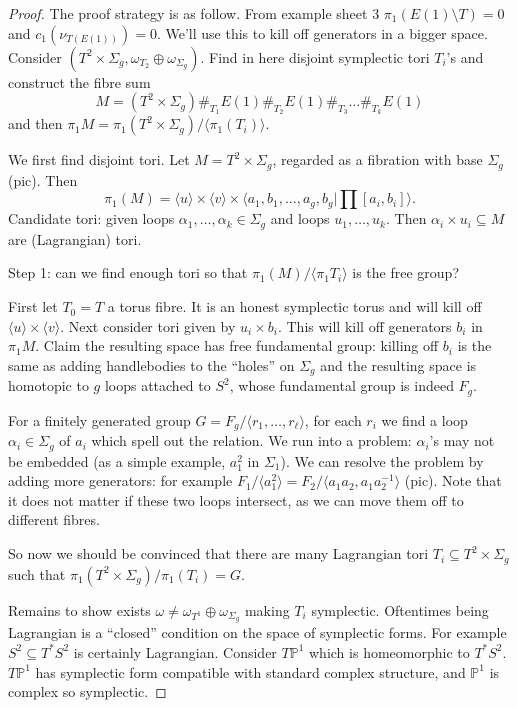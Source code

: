 \documentclass[a4paper]{article}
\renewcommand*{\P}{\mathbb{P}}
\begin{document}
\begin{proof}
  The proof strategy is as follow. From example sheet 3 \(\pi_1(E(1) \setminus T) = 0\) and \(c_1(\nu_{T(E(1))}) = 0\). We'll use this to kill off generators in a bigger space. Consider \((T^2 \times \Sigma_g, \omega_{T_2} \oplus \omega_{\Sigma_g})\). Find in here disjoint symplectic tori \(T_i\)'s and construct the fibre sum
  \[
    M = (T^2 \times \Sigma_g) \#_{T_1} E(1) \#_{T_2} E(1) \#_{T_3} \dots \#_{T_k} E(1)
  \]
  and then \(\pi_1M = \pi_1(T^2 \times \Sigma_g)/\langle \pi_1(T_i)\rangle\).

  We first find disjoint tori. Let \(M = T^2 \times \Sigma_g\), regarded as a fibration with base \(\Sigma_g\) (pic). Then
  \[
    \pi_1(M) = \langle u \rangle \times \langle v \rangle \times \langle a_1, b_1, \dots, a_g, b_g | \prod [a_i, b_i] \rangle.
  \]
  Candidate tori: given loops \(\alpha_1, \dots, \alpha_k \in \Sigma_g\) and loops \(u_1, \dots, u_k\). Then \(\alpha_i \times u_i \subseteq M\) are (Lagrangian) tori.

  Step 1: can we find enough tori so that \(\pi_1(M)/\langle \pi_1 T_i\rangle\) is the free group?

  First let \(T_0 = T\) a torus fibre. It is an honest symplectic torus and will kill off \(\langle u \rangle \times \langle v \rangle\). Next consider tori given by \(u_i \times b_i\). This will kill off generators \(b_i\) in \(\pi_1M\). Claim the resulting space has free fundamental group: killing off \(b_i\) is the same as adding handlebodies to the ``holes'' on \(\Sigma_g\) and the resulting space is homotopic to \(g\) loops attached to \(S^2\), whose fundamental group is indeed \(F_g\).

  For a finitely generated group \(G = F_g/ \langle r_1, \dots, r_\ell \rangle\), for each \(r_i\) we find a loop \(\alpha_i \in \Sigma_g\) of \(a_i\) which spell out the relation. We run into a problem: \(\alpha_i\)'s may not be embedded (as a simple example, \(a_1^2\) in \(\Sigma_1\)). We can resolve the problem by adding more generators: for example \(F_1/\langle a_1^2 \rangle = F_2/\langle a_1a_2, a_1a_2^{-1} \rangle\) (pic). Note that it does not matter if these two loops intersect, as we can move them off to different fibres.

  So now we should be convinced that there are many Lagrangian tori \(T_i \subseteq T^2 \times \Sigma_g\) such that \(\pi_1(T^2 \times \Sigma_g)/\pi_1(T_i) = G\).

  Remains to show exists \(\omega \ne \omega_{T^1} \oplus \omega_{\Sigma_g}\) making \(T_i\) symplectic. Oftentimes being Lagrangian is a ``closed'' condition on the space of symplectic forms. For example \(S^2 \subseteq T^*S^2\) is certainly Lagrangian. Consider \(T\P^1\) which is homeomorphic to \(T^*S^2\). \(T\P^1\) has symplectic form compatible with standard complex structure, and \(\P^1\) is complex so symplectic.


\end{proof}
\end{document}
